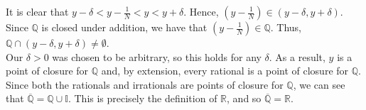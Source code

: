 \documentclass[12pt]{article}
\begin{document}
It is clear that $y - \delta < y - \frac{1}{N} < y < y + \delta$. Hence, $(y - \frac{1}{N}) \in (y - \delta, y + \delta)$.\\

Since $\mathbb{Q}$ is closed under addition, we have that $(y - \frac{1}{N}) \in \mathbb{Q}$. Thus, $\mathbb{Q} \cap (y - \delta, y + \delta) \neq \emptyset$.\\

Our $\delta > 0$ was chosen to be arbitrary, so this holds for any $\delta$. As a result, $y$ is a point of closure for $\mathbb{Q}$ and, by extension, every rational is a point of closure for $\mathbb{Q}$.\\

Since both the rationals and irrationals are points of closure for $\mathbb{Q}$, we can see that $\overline{\mathbb{Q}} = \mathbb{Q} \cup \mathbb{I}$. This is precisely the definition of $\mathbb{R}$, and so $\overline{\mathbb{Q}} = \mathbb{R}$.
\end{document}
